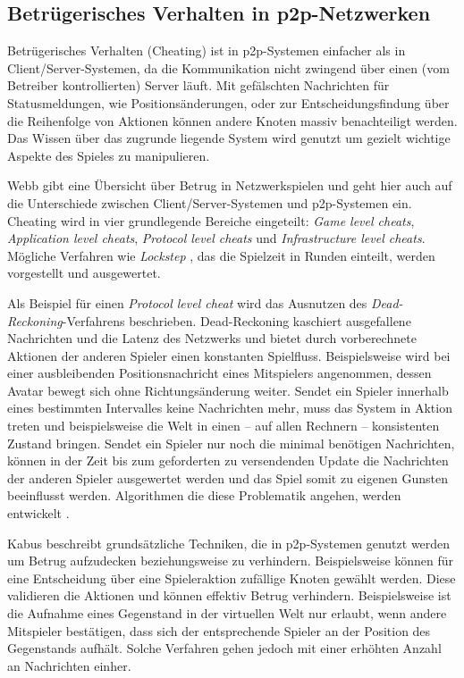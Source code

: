 \subsection{Betrügerisches Verhalten in p2p-Netzwerken}
\label{chap:grundlagen:cheating}
Betrügerisches Verhalten (Cheating) ist in p2p-Systemen einfacher als in Client/Server-Systemen, da die Kommunikation nicht zwingend über einen (vom Betreiber kontrollierten) Server läuft. Mit gefälschten Nachrichten für Statusmeldungen, wie Positionsänderungen, oder zur Entscheidungsfindung über die Reihenfolge von Aktionen können andere Knoten massiv benachteiligt werden. Das Wissen über das zugrunde liegende System wird genutzt um gezielt wichtige Aspekte des Spieles zu manipulieren.

Webb \cite{Webb2007Cheating} gibt eine Übersicht über Betrug in Netzwerkspielen und geht hier auch auf die Unterschiede zwischen Client/Server-Systemen und p2p-Systemen ein. Cheating wird in vier grundlegende Bereiche eingeteilt: \emph{Game level cheats}, \emph{Application level cheats}, \emph{Protocol level cheats} und \emph{Infrastructure level cheats}. Mögliche Verfahren wie \emph{Lockstep} \cite{Baughman2007}, das die Spielzeit in Runden einteilt, werden vorgestellt und ausgewertet.

Als Beispiel für einen \emph{Protocol level cheat} wird das Ausnutzen des \emph{Dead-Reckoning}-Verfahrens \cite{Pantel2002} beschrieben. Dead-Reckoning kaschiert ausgefallene Nachrichten und die Latenz des Netzwerks und bietet durch vorberechnete Aktionen der anderen Spieler einen konstanten Spielfluss. Beispielsweise wird bei einer ausbleibenden Positionsnachricht eines Mitspielers angenommen, dessen Avatar bewegt sich ohne Richtungsänderung weiter. Sendet ein Spieler innerhalb eines bestimmten Intervalles keine Nachrichten mehr, muss das System in Aktion treten und beispielsweise die Welt in einen -- auf allen Rechnern -- konsistenten Zustand bringen. Sendet ein Spieler nur noch die minimal benötigen Nachrichten, können in der Zeit bis zum geforderten zu versendenden Update die Nachrichten der anderen Spieler ausgewertet werden und das Spiel somit zu eigenen Gunsten beeinflusst werden. Algorithmen die diese Problematik angehen, werden entwickelt \cite{Aggarwal2005}.

Kabus \cite{Kabus2007Design, Kabus2009} beschreibt grundsätzliche Techniken, die in p2p-Systemen genutzt werden um Betrug aufzudecken beziehungsweise zu verhindern. Beispielsweise können für eine Entscheidung über eine Spieleraktion zufällige Knoten gewählt werden. Diese validieren die Aktionen und können effektiv Betrug verhindern. Beispielsweise ist die Aufnahme eines Gegenstand in der virtuellen Welt nur erlaubt, wenn andere Mitspieler bestätigen, dass sich der entsprechende Spieler an der Position des Gegenstands aufhält. Solche Verfahren gehen jedoch mit einer erhöhten Anzahl an Nachrichten einher.

